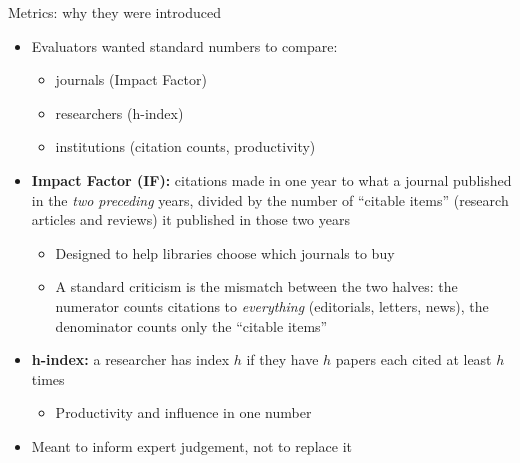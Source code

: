 \documentclass[aspectratio=169]{beamer}
\begin{document}
\begin{frame}{Metrics: why they were introduced}
\begin{itemize}

  \item Evaluators wanted standard numbers to compare:
    \begin{itemize}
      \item journals (Impact Factor)
      \item researchers (h-index)
      \item institutions (citation counts, productivity)
    \end{itemize}

  \item \textbf{Impact Factor (IF):} citations made in one year to what a journal published in the \emph{two preceding} years, divided by the number of ``citable items'' (research articles and reviews) it published in those two years
  \begin{itemize}
    \item Designed to help libraries choose which journals to buy
    \item A standard criticism is the mismatch between the two halves: the numerator counts citations to \emph{everything} (editorials, letters, news), the denominator counts only the ``citable items''
  \end{itemize}

  \item \textbf{h-index:} a researcher has index $h$ if they have $h$ papers each cited at least $h$ times
  \begin{itemize}
    \item Productivity and influence in one number
  \end{itemize}

  \item Meant to inform expert judgement, not to replace it

\end{itemize}
\end{frame}
\end{document}
